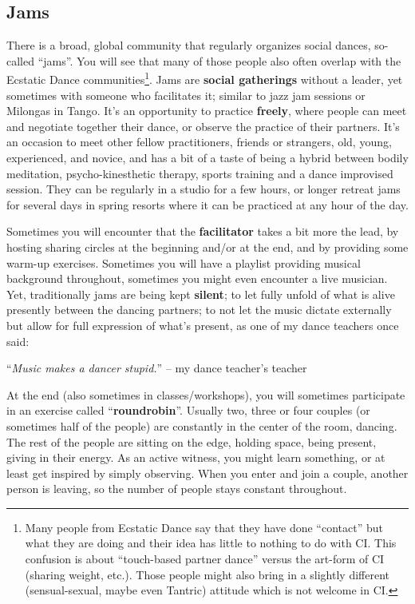 \subsection{Jams}\label{sec:jams}

There is a broad, global community that regularly organizes social dances, so-called ``\gls{jam}s''.
You will see that many of those people also often overlap with the Ecstatic Dance communities\footnote{Many people from Ecstatic Dance say that they have done ``contact'' but what they are doing and their idea has little to nothing to do with CI. This confusion is about ``touch-based partner dance'' versus the art-form of CI (sharing weight, etc.). Those people might also bring in a slightly different (sensual-sexual, maybe even Tantric) attitude which is not welcome in CI.}.
Jams are \textbf{social gatherings} without a leader, yet sometimes with someone who facilitates it; similar to jazz jam sessions or Milongas in Tango.
It's an opportunity to practice \textbf{freely}, where people can meet and negotiate together their dance, or observe the practice of their partners.
It's an occasion to meet other fellow practitioners, friends or strangers, old, young, experienced, and novice, and has a bit of a taste of being a hybrid between bodily meditation, psycho-kinesthetic therapy, sports training and a dance improvised session.
They can be regularly in a studio for a few hours, or longer retreat jams for several days in spring resorts where it can be practiced at any hour of the day.

Sometimes you will encounter that the \textbf{facilitator} takes a bit more the lead, by hosting sharing circles at the beginning and/or at the end, and by providing some warm-up exercises.
Sometimes you will have a playlist providing musical background throughout, sometimes you might even encounter a live musician.
Yet, traditionally jams are being kept \textbf{silent}; to let fully unfold of what is alive presently between the dancing partners; to not let the music dictate externally but allow for full expression of what's present, as one of my dance teachers once said:

\begin{displayquote}
    ``\textit{Music makes a dancer stupid.}'' -- my dance teacher's teacher
\end{displayquote}

At the end (also sometimes in classes/workshops), you will sometimes participate in an exercise called ``\textbf{\gls{roundrobin}}''.
Usually two, three or four couples (or sometimes half of the people) are constantly in the center of the room, dancing.
The rest of the people are sitting on the edge, holding space, being present, giving in their energy.
As an active witness, you might learn something, or at least get inspired by simply observing.
When you enter and join a couple, another person is leaving, so the number of people stays constant throughout.

